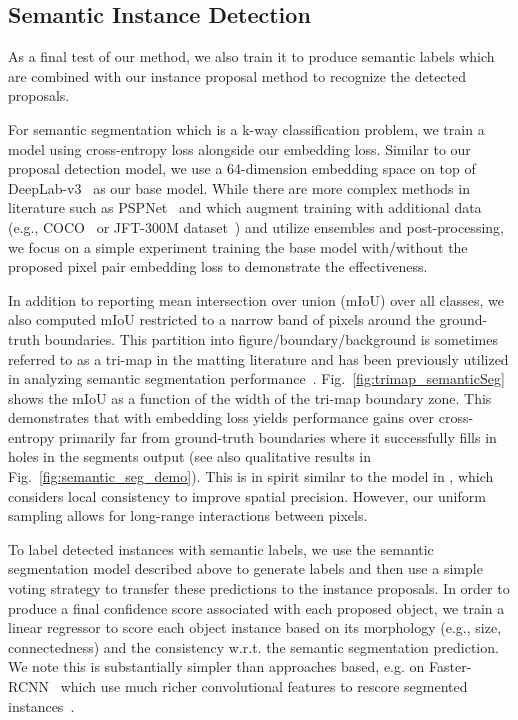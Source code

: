 \subsection{Semantic Instance Detection}


As a final test of our method, we also train it to produce semantic labels
which are combined with our instance proposal method to recognize the detected
proposals.

For semantic segmentation which is a k-way classification problem, we train a
model using cross-entropy loss alongside our embedding loss.  Similar to our
proposal detection model, we use a 64-dimension embedding space on top of
DeepLab-v3~\cite{chen2017rethinking} as our base model.  While there are more
complex methods in literature such as PSPNet~\cite{zhao2016pyramid} and which
augment training with additional data (e.g., COCO~\cite{lin2014microsoft} or
JFT-300M dataset~\cite{sun2017revisiting}) and utilize ensembles and
post-processing, we focus on a simple experiment training the base model
with/without the proposed pixel pair embedding loss to demonstrate the
effectiveness. 

In addition to reporting mean intersection over union (mIoU) over all
classes,
we also computed mIoU restricted to a narrow band of pixels around the
ground-truth boundaries.  This partition into figure/boundary/background is
sometimes referred to as a tri-map in the matting literature and has been
previously utilized in analyzing semantic segmentation
performance~\cite{kohli2009robust, chen2016deeplab, ghiasi2016laplacian}.
Fig.~\ref{fig:trimap_semanticSeg} shows the mIoU as a function of the width
of the tri-map boundary zone.  This demonstrates that with embedding loss
yields performance gains over cross-entropy primarily far from ground-truth
boundaries where it successfully fills in holes in the segments output
(see also qualitative results in Fig.~\ref{fig:semantic_seg_demo}).
This is in spirit similar to the model in \cite{harley2017segmentation},
which considers local consistency to improve spatial precision.
However, our uniform sampling allows for long-range interactions between pixels.


To label detected instances with semantic labels, we use the semantic
segmentation model described above to generate labels and then use a simple
voting strategy to transfer these predictions to the instance proposals.  In
order to produce a final confidence score associated with each proposed object,
we train a linear regressor to score each object instance based on its
morphology (e.g., size, connectedness) and the consistency w.r.t. the semantic
segmentation prediction. We note this is substantially simpler than approaches
based, e.g. on Faster-RCNN~\cite{ren2015faster} which use much richer convolutional features to
rescore segmented instances~\cite{he2017mask}.


